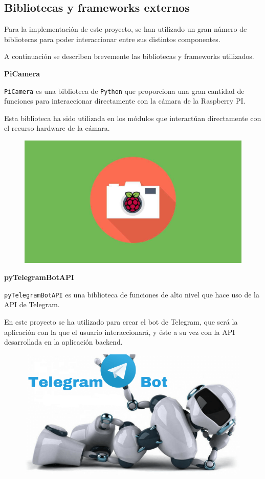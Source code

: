 \subsection{Bibliotecas y frameworks externos}

Para la implementación de este proyecto, se han utilizado un gran número de bibliotecas para poder interaccionar entre sus distintos componentes.

A continuación se describen brevemente las bibliotecas y frameworks utilizados.

\newpage

\textbf{PiCamera}

\texttt{PiCamera} \cite{ref12} es una biblioteca de \texttt{Python} que proporciona una gran cantidad de funciones para interaccionar directamente con la cámara de la Raspberry PI.

Esta biblioteca ha sido utilizada en los módulos que interactúan directamente con el recurso hardware de la cámara.


\begin{figure}[h]
	\centering
	\includegraphics[scale=0.09]{images/11}
\end{figure}

\textbf{pyTelegramBotAPI}

\texttt{pyTelegramBotAPI} \cite{ref13} es una biblioteca de funciones de alto nivel que hace uso de la API de Telegram.

En este proyecto se ha utilizado para crear el bot de Telegram, que será la aplicación con la que el usuario interaccionará, y éste a su vez con la API desarrollada en la aplicación backend.

\begin{figure}[h]
	\centering
	\includegraphics[scale=0.22]{images/12}
\end{figure}

